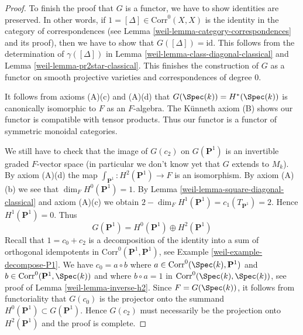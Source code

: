 \begin{proof}
\medskip\noindent
To finish the proof that $G$ is a functor,
we have to show identities are preserved. In other words, if
$1 = [\Delta] \in \text{Corr}^0(X, X)$ is the identity
in the category of correspondences (see
Lemma \ref{weil-lemma-category-correspondences} and its proof),
then we have to show that $G([\Delta]) = \text{id}$.
This follows from the determination of
$\gamma([\Delta])$ in Lemma \ref{weil-lemma-class-diagonal-classical}
and Lemma \ref{weil-lemma-pr2star-classical}.
This finishes the construction of $G$ as a functor on
smooth projective varieties and correspondences of degree $0$.

\medskip\noindent
It follows from axioms (A)(c) and (A)(d) that
$G(\Spec(k)) = H^*(\Spec(k))$ is canonically isomorphic to $F$
as an $F$-algebra.
The K\"unneth axiom (B) shows our functor is compatible with tensor products.
Thus our functor is a functor of symmetric monoidal categories.

\medskip\noindent
We still have to check that the image of $G(c_2)$ on $G(\mathbf{P}^1)$
is an invertible graded $F$-vector space (in particular we don't know yet
that $G$ extends to $M_k$).
By axiom (A)(d) the map $\int_{\mathbf{P}^1} : H^2(\mathbf{P}^1) \to F$
is an isomorphism. By axiom (A)(b) we see that $\dim_F H^0(\mathbf{P}^1) = 1$.
By Lemma \ref{weil-lemma-square-diagonal-classical} and axiom (A)(c)
we obtain $2 - \dim_F H^1(\mathbf{P}^1) = c_1(T_{\mathbf{P}^1}) = 2$.
Hence $H^1(\mathbf{P}^1) = 0$. Thus
$$
G(\mathbf{P}^1) = H^0(\mathbf{P}^1) \oplus H^2(\mathbf{P}^1)
$$
Recall that $1 = c_0 + c_2$ is a decomposition of the identity
into a sum of orthogonal idempotents in
$\text{Corr}^0(\mathbf{P}^1, \mathbf{P}^1)$, see
Example \ref{weil-example-decompose-P1}. We have $c_0 = a \circ b$ where
$a \in \text{Corr}^0(\Spec(k), \mathbf{P}^1)$ and
$b \in \text{Corr}^0(\mathbf{P}^1, \Spec(k))$ and where
$b \circ a = 1$ in $\text{Corr}^0(\Spec(k), \Spec(k))$, see proof of
Lemma \ref{weil-lemma-inverse-h2}. Since $F = G(\Spec(k))$, it follows from
functoriality that $G(c_0)$ is the projector onto the summand
$H^0(\mathbf{P}^1) \subset G(\mathbf{P}^1)$. Hence
$G(c_2)$ must necessarily be the projection onto $H^2(\mathbf{P}^1)$
and the proof is complete.
\end{proof}

